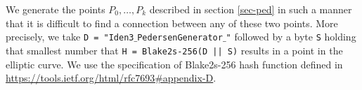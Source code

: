 
{\color{blue}{Barry!}}
We generate the points $P_0,\dots,P_k$ described in section \ref{sec-ped} in such a manner that it is difficult to find a connection between any of these two points. More precisely, we take  
\texttt{D =  "Iden3$\_$PedersenGenerator$\_$"} followed by a byte \texttt{S} holding that smallest number that 
\texttt{H = Blake2s-256(D || S)} results in a point in the elliptic curve. We use the specification of Blake2s-256 hash function defined in \url{https://tools.ietf.org/html/rfc7693#appendix-D}.

